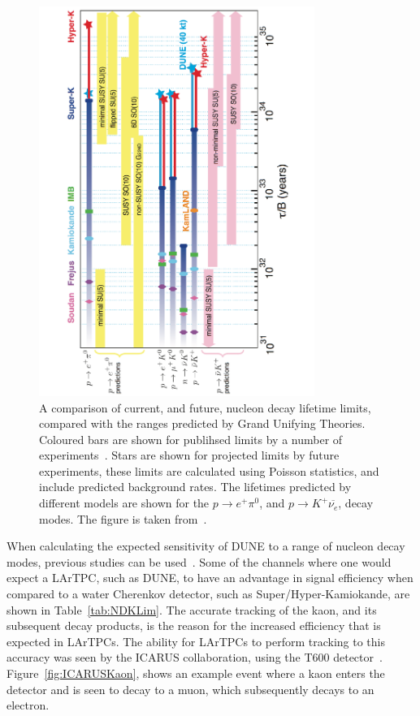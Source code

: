 \begin{figure}
  \centering
  \includegraphics[width=0.8\textwidth]{NucleonDecayLimits}
  \caption[A comparison of current, and future, nucleon decay lifetime limits, compared with the ranges predicted by Grand Unifying Theories.]
          {A comparison of current, and future, nucleon decay lifetime limits, compared with the ranges predicted by Grand Unifying Theories. Coloured bars are shown for publihsed limits by a number of experiments~\citep{PDG2012, Nishino:2012bnw}. Stars are shown for projected limits by future experiments, these limits are calculated using Poisson statistics, and include predicted background rates. The lifetimes predicted by different models are shown for the $p \rightarrow e^{+} \pi^{0}$, and $p \rightarrow K^{+} \overline{\nu_{e}}$, decay modes. The figure is taken from~\citep{DUNECDR_V2}.}
  \label{fig:DUNE_NDK_Lifetime}
\end{figure}

When calculating the expected sensitivity of DUNE to a range of nucleon decay modes, previous studies can be used~\citep{Bueno,Klinger:2015kva}. Some of the channels where one would expect a LArTPC, such as DUNE, to have an advantage in signal efficiency when compared to a water Cherenkov detector, such as Super/Hyper-Kamiokande, are shown in Table~\ref{tab:NDKLim}. The accurate tracking of the kaon, and its subsequent decay products, is the reason for the increased efficiency that is expected in LArTPCs. The ability for LArTPCs to perform tracking to this accuracy was seen by the ICARUS collaboration, using the T600 detector~\citep{PMTrack}. Figure~\ref{fig:ICARUSKaon}, shows an example event where a kaon enters the detector and is seen to decay to a muon, which subsequently decays to an electron. \\

